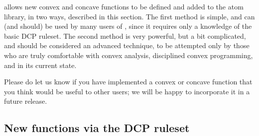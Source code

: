 \documentclass[12pt]{article}
\begin{document}
\cvx allows new convex and concave functions to be defined and added to the
atom library, in two ways, described in this section.
The first method is simple, and can (and should) be used by 
many users of \cvx, since it requires only a knowledge of the 
basic DCP ruleset.
The second method is very powerful, but a bit complicated, and
should be considered an advanced technique, to be attempted only by those 
who are truly comfortable
with convex analysis, disciplined convex programming,
and \cvx in its current state.

Please do let us know if you have implemented a convex or concave function
that you think would be useful to other users; we will be happy to 
incorporate it in a future release.

\subsection{New functions via the DCP ruleset}
\end{document}
